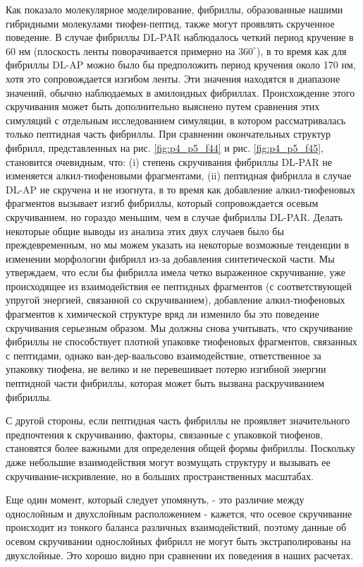     Как показало молекулярное моделирование, фибриллы, образованные нашими гибридными молекулами тиофен-пептид, также могут проявлять скрученное поведение. В случае фибриллы DL-PAR наблюдалось четкий период кручение в 60 нм (плоскость ленты поворачивается примерно на $360^{\circ}$), в то время как для фибриллы DL-AP можно было бы предположить период кручения около 170 нм, хотя это сопровождается изгибом ленты. Эти значения находятся в диапазоне значений, обычно наблюдаемых в амилоидных фибриллах. Происхождение этого скручивания может быть дополнительно выяснено путем сравнения этих симуляций с отдельным исследованием симуляции, в котором рассматривалась только пептидная часть фибриллы. При сравнении окончательных структур фибрилл, представленных на рис. \ref{fig:p4_p5_f44} и рис. \ref{fig:p4_p5_f45}, становится очевидным, что: (i) степень скручивания фибриллы DL-PAR не изменяется алкил-тиофеновыми фрагментами, (ii) пептидная фибрилла в случае DL-AP не скручена и не изогнута, в то время как добавление алкил-тиофеновых фрагментов вызывает изгиб фибриллы, который сопровождается осевым скручиванием, но гораздо меньшим, чем в случае фибриллы DL-PAR. Делать некоторые общие выводы из анализа этих двух случаев было бы преждевременным, но мы можем указать на некоторые возможные тенденции в изменении морфологии фибрилл из-за добавления синтетической части. Мы утверждаем, что если бы фибрилла имела четко выраженное скручивание, уже происходящее из взаимодействия ее пептидных фрагментов (с соответствующей упругой энергией, связанной со скручиванием), добавление алкил-тиофеновых фрагментов к химической структуре вряд ли изменило бы это поведение скручивания серьезным образом. Мы должны снова учитывать, что скручивание фибриллы не способствует плотной упаковке тиофеновых фрагментов, связанных с пептидами, однако ван-дер-ваальсово взаимодействие, ответственное за упаковку тиофена, не велико и не перевешивает потерю изгибной энергии пептидной части фибриллы, которая может быть вызвана раскручиванием фибриллы.
    
    С другой стороны, если пептидная часть фибриллы не проявляет значительного предпочтения к скручиванию, факторы, связанные с упаковкой тиофенов, становятся более важными для определения общей формы фибриллы. Поскольку даже небольшие взаимодействия могут возмущать структуру и вызывать ее скручивание-искривление, но в больших пространственных масштабах.
    
    Еще один момент, который следует упомянуть, - это различие между однослойным и двухслойным расположением - кажется, что осевое скручивание происходит из тонкого баланса различных взаимодействий, поэтому данные об осевом скручивании однослойных фибрилл не могут быть экстраполированы на двухслойные. Это хорошо видно при сравнении их поведения в наших расчетах.
    
